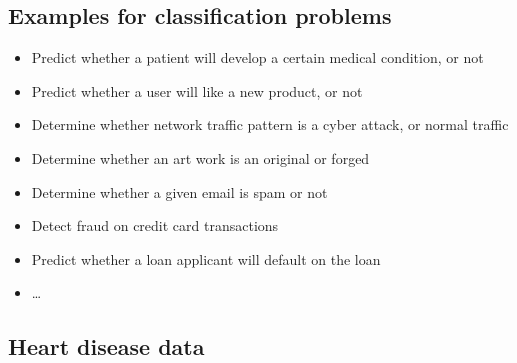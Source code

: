 \subsection{Examples for classification problems}

 \begin{itemize}
   \item Predict whether a patient will develop a certain medical condition, or not
   \item Predict whether a user will like a new product, or not
   \item Determine whether network traffic pattern is a cyber attack, or normal
     traffic
    \item Determine whether an art work is an original or forged
    \item Determine whether a given email is spam or not
      \item Detect fraud on credit card transactions
        \item Predict whether a loan applicant will default on the loan
    \item \ldots
  \end{itemize}

  \subsection{Heart disease data}

